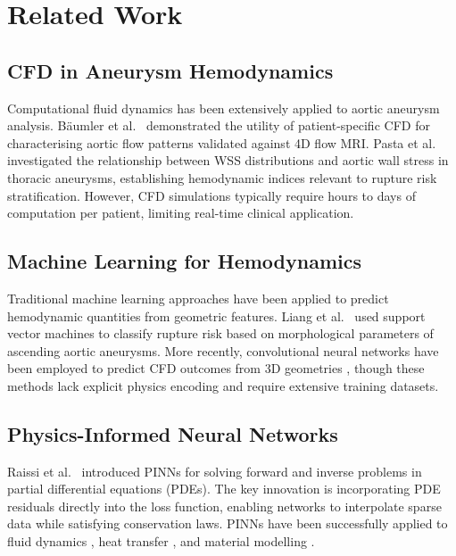 \documentclass[11pt,a4paper]{article}
\begin{document}
\section{Related Work}

\subsection{CFD in Aneurysm Hemodynamics}

Computational fluid dynamics has been extensively applied to aortic aneurysm analysis. Bäumler et al.\ \cite{ref7} demonstrated the utility of patient-specific CFD for characterising aortic flow patterns validated against 4D flow MRI. Pasta et al.\ \cite{ref8} investigated the relationship between WSS distributions and aortic wall stress in thoracic aneurysms, establishing hemodynamic indices relevant to rupture risk stratification. However, CFD simulations typically require hours to days of computation per patient, limiting real-time clinical application.

\subsection{Machine Learning for Hemodynamics}

Traditional machine learning approaches have been applied to predict hemodynamic quantities from geometric features. Liang et al.\ \cite{ref9} used support vector machines to classify rupture risk based on morphological parameters of ascending aortic aneurysms. More recently, convolutional neural networks have been employed to predict CFD outcomes from 3D geometries \cite{ref10}, though these methods lack explicit physics encoding and require extensive training datasets.

\subsection{Physics-Informed Neural Networks}

Raissi et al.\ \cite{raissi2019pinns} introduced PINNs for solving forward and inverse problems in partial differential equations (PDEs). The key innovation is incorporating PDE residuals directly into the loss function, enabling networks to interpolate sparse data while satisfying conservation laws. PINNs have been successfully applied to fluid dynamics \cite{ref11}, heat transfer \cite{ref12}, and material modelling \cite{ref13}.
\end{document}
